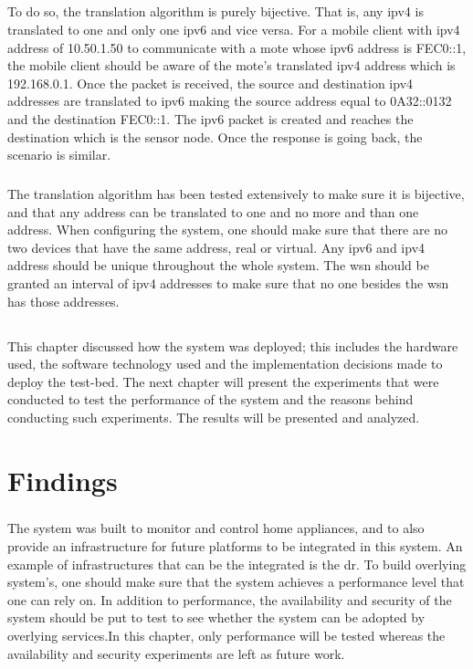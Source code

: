 \documentclass[12pt,a4paper,final]{report}
\begin{document}
\paragraph{}
To do so, the translation algorithm is purely bijective. That is, any \gls{ipv4} is translated to one and only one \gls{ipv6} and vice versa. For a mobile client with \gls{ipv4} address of 10.50.1.50 to communicate with a mote whose \gls{ipv6} address is FEC0::1, the mobile client should be aware of the mote's translated \gls{ipv4} address which is 192.168.0.1. Once the packet is received, the source and destination \gls{ipv4} addresses are translated to \gls{ipv6} making the source address equal to 0A32::0132 and the destination FEC0::1. The \gls{ipv6} packet is created and reaches the destination which is the sensor node. Once the response is going back, the scenario is similar.
\paragraph{}
The translation algorithm has been tested extensively to make sure it is bijective, and that any address can be translated to one and no more and than one address. When configuring the system, one should make sure that there are no two devices that have the same address, real or virtual. Any \gls{ipv6} and \gls{ipv4} address should be unique throughout the whole system. The \gls{wsn} should be granted an interval of \gls{ipv4} addresses to make sure that no one besides the \gls{wsn} has those addresses.

\section*{}
\paragraph{}
This chapter discussed how the system was deployed; this includes the hardware used, the software technology used and the implementation decisions made to deploy the test-bed. The next chapter will present the experiments that were conducted to test the performance of the system and the reasons behind conducting such experiments. The results will be presented and analyzed.

\chapter{Findings}
\paragraph{}
The system was built to monitor and control home appliances, and to also provide an infrastructure for future platforms to be integrated in this system. An example of infrastructures that can be the integrated is the \gls{dr}. To build overlying system's, one should make sure that the system achieves a performance level that one can rely on.  In addition to performance, the availability and security of the system should be put to test to see whether the system can be adopted by overlying services.In this chapter, only performance will be tested whereas the availability and security experiments are left as future work.
\end{document}
